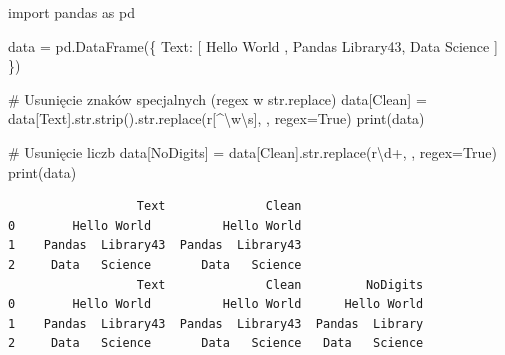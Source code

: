 \documentclass[
  polish,
  letterpaper,
  DIV=11,
  numbers=noendperiod]{scrreprt}
\newenvironment{Shaded}{\begin{snugshade}}{\end{snugshade}}
\newcommand{\BuiltInTok}[1]{\textcolor[rgb]{0.00,0.23,0.31}{#1}}
\newcommand{\CommentTok}[1]{\textcolor[rgb]{0.37,0.37,0.37}{#1}}
\newcommand{\DecValTok}[1]{\textcolor[rgb]{0.68,0.00,0.00}{#1}}
\newcommand{\ImportTok}[1]{\textcolor[rgb]{0.00,0.46,0.62}{#1}}
\newcommand{\NormalTok}[1]{\textcolor[rgb]{0.00,0.23,0.31}{#1}}
\newcommand{\OperatorTok}[1]{\textcolor[rgb]{0.37,0.37,0.37}{#1}}
\newcommand{\PreprocessorTok}[1]{\textcolor[rgb]{0.68,0.00,0.00}{#1}}
\newcommand{\StringTok}[1]{\textcolor[rgb]{0.13,0.47,0.30}{#1}}
\newcommand{\VariableTok}[1]{\textcolor[rgb]{0.07,0.07,0.07}{#1}}
\newcommand{\VerbatimStringTok}[1]{\textcolor[rgb]{0.13,0.47,0.30}{#1}}
\begin{document}
\begin{Shaded}
\begin{Highlighting}[]
\ImportTok{import}\NormalTok{ pandas }\ImportTok{as}\NormalTok{ pd}

\NormalTok{data }\OperatorTok{=}\NormalTok{ pd.DataFrame(\{}
    \StringTok{\textquotesingle{}Text\textquotesingle{}}\NormalTok{: [}\StringTok{\textquotesingle{}  Hello World  \textquotesingle{}}\NormalTok{, }\StringTok{\textquotesingle{}Pandas  Library43\textquotesingle{}}\NormalTok{, }\StringTok{\textquotesingle{}   Data   Science  \textquotesingle{}}\NormalTok{]}
\NormalTok{\})}

\CommentTok{\# Usunięcie znaków specjalnych (regex w str.replace)}
\NormalTok{data[}\StringTok{\textquotesingle{}Clean\textquotesingle{}}\NormalTok{] }\OperatorTok{=}\NormalTok{ data[}\StringTok{\textquotesingle{}Text\textquotesingle{}}\NormalTok{].}\BuiltInTok{str}\NormalTok{.strip().}\BuiltInTok{str}\NormalTok{.replace(}\VerbatimStringTok{r\textquotesingle{}}\PreprocessorTok{[\^{}}\DecValTok{\textbackslash{}w\textbackslash{}s}\PreprocessorTok{]}\VerbatimStringTok{\textquotesingle{}}\NormalTok{, }\StringTok{\textquotesingle{}\textquotesingle{}}\NormalTok{, regex}\OperatorTok{=}\VariableTok{True}\NormalTok{)}
\BuiltInTok{print}\NormalTok{(data)}

\CommentTok{\# Usunięcie liczb}
\NormalTok{data[}\StringTok{\textquotesingle{}NoDigits\textquotesingle{}}\NormalTok{] }\OperatorTok{=}\NormalTok{ data[}\StringTok{\textquotesingle{}Clean\textquotesingle{}}\NormalTok{].}\BuiltInTok{str}\NormalTok{.replace(}\VerbatimStringTok{r\textquotesingle{}}\DecValTok{\textbackslash{}d}\OperatorTok{+}\VerbatimStringTok{\textquotesingle{}}\NormalTok{, }\StringTok{\textquotesingle{}\textquotesingle{}}\NormalTok{, regex}\OperatorTok{=}\VariableTok{True}\NormalTok{)}
\BuiltInTok{print}\NormalTok{(data)}
\end{Highlighting}
\end{Shaded}

\begin{verbatim}
                  Text              Clean
0        Hello World          Hello World
1    Pandas  Library43  Pandas  Library43
2     Data   Science       Data   Science
                  Text              Clean         NoDigits
0        Hello World          Hello World      Hello World
1    Pandas  Library43  Pandas  Library43  Pandas  Library
2     Data   Science       Data   Science   Data   Science
\end{verbatim}
\end{document}
